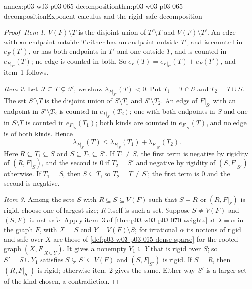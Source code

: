 \begin{annexitem}{annex:p03-w03-p03-065-decomposition}{thm:p03-w03-p03-065-decomposition}{Exponent calculus and the rigid--safe decomposition}
\begin{proof}
\emph{Item 1.}  \(V(F)\setminus T\) is the disjoint union of
\(T'\setminus T\) and \(V(F)\setminus T'\).  An edge with an endpoint outside
\(T\) either has an endpoint outside \(T'\), and is counted in \(e_F(T')\),
or has both endpoints in \(T'\) and one outside \(T\), and is counted in
\(e_{F|_{T'}}(T)\); no edge is counted in both.  So
\(e_F(T)=e_{F|_{T'}}(T)+e_F(T')\), and item~1 follows.

\emph{Item 2.}  Let \(R\subseteq T\subsetneq S'\); we show
\(\lambda_{F|_{S'}}(T)<0\).  Put \(T_1=T\cap S\) and \(T_2=T\cup S\).  The
set \(S'\setminus T\) is the disjoint union of \(S\setminus T_1\) and
\(S'\setminus T_2\).  An edge of \(F|_{S'}\) with an endpoint in
\(S'\setminus T_2\) is counted in \(e_{F|_{S'}}(T_2)\); one with both
endpoints in \(S\) and one in \(S\setminus T\) is counted in
\(e_{F|_S}(T_1)\); both kinds are counted in \(e_{F|_{S'}}(T)\), and no edge
is of both kinds.  Hence
\[
  \lambda_{F|_{S'}}(T)\leq\lambda_{F|_S}(T_1)+\lambda_{F|_{S'}}(T_2).
\]
Here \(R\subseteq T_1\subseteq S\) and \(S\subseteq T_2\subseteq S'\).  If
\(T_1\neq S\), the first term is negative by rigidity of \((R,F|_S)\), and the
second is \(0\) if \(T_2=S'\) and negative by rigidity of \((S,F|_{S'})\)
otherwise.  If \(T_1=S\), then \(S\subseteq T\), so \(T_2=T\neq S'\); the
first term is \(0\) and the second is negative.

\emph{Item 3.}  Among the sets \(S\) with \(R\subseteq S\subseteq V(F)\)
such that \(S=R\) or \((R,F|_S)\) is rigid, choose one of largest size; \(R\)
itself is such a set.  Suppose \(S\neq V(F)\) and \((S,F)\) is not safe.
Apply item~3 of \cref{thm:p03-w03-p03-070-weights} at \(\lambda=\alpha\)
in the graph \(F\), with \(X=S\) and \(Y=V(F)\setminus S\); for irrational
\(\alpha\) its notions of rigid and safe over \(X\) are those of
\cref{def:p03-w03-p03-065-dense-sparse} for the rooted graph \((X,F|_{X\cup
Y})\).  It gives a nonempty \(Y_1\subseteq Y\) that is rigid over \(S\); so
\(S'=S\cup Y_1\) satisfies \(S\subsetneq S'\subseteq V(F)\) and
\((S,F|_{S'})\) is rigid.  If
\(S=R\), then \((R,F|_{S'})\) is rigid; otherwise item~2 gives the same.
Either way \(S'\) is a larger set of the kind chosen, a contradiction.
\end{proof}
\end{annexitem}

